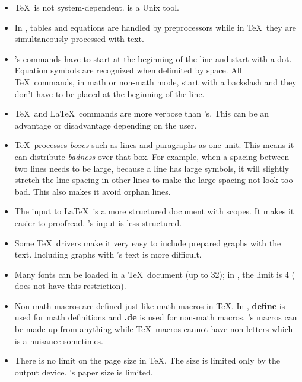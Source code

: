 \begin{itemize}
\item \TeX\ is not system-dependent. \Troff\/ is a Unix tool.

\item In \Troff, tables and equations are handled by preprocessors
while in \TeX\ they are simultaneously processed with text.

\item \Troff\/'s commands have to start at the beginning of the line
and start with a dot. Equation symbols are recognized when delimited by space.
All \TeX\ commands, in math or non-math mode, start with a backslash
and they don't have to be placed at the beginning of the line.

\item \TeX\ and \LaTeX\ commands are more verbose than \troff\/'s.
This can be an advantage or disadvantage depending on the user.

\item \TeX\ processes {\it boxes} such as lines and paragraphs as one unit.
This means it can distribute {\it badness} over that box.
For example, when a spacing between two lines needs to be large, because
a line has large symbols, it will slightly stretch the
line spacing in other lines to make the large spacing not look
too bad. This also makes it avoid orphan lines.

\item The input to \LaTeX\ is a more structured document with scopes. It makes it
easier to proofread. \Troff\/'s input is less structured.

\item Some  \TeX\ drivers make it very easy to include prepared
graphs with the text. Including graphs with \troff\/'s text is more difficult.

\item Many fonts can be loaded in a \TeX\ document (up to 32); in \troff,
the limit is 4 (\ditroff\/ does not have this restriction).

\item Non-math macros are defined just like math macros in \TeX.
In \troff, {\bf define} is used for math definitions and {\bf .de} is
used for non-math macros.
\Troff\/'s macros can be made up from anything while
\TeX\ macros cannot have non-letters which is a nuisance sometimes.

\item There is no limit on the page size in \TeX. The size is limited only by
the output device. \Troff\/'s paper size is limited.


\end{itemize}
